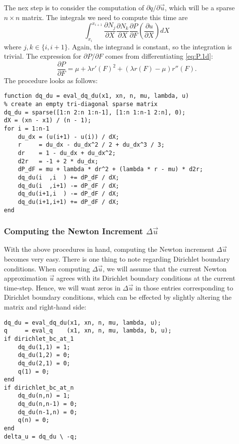 The nex step is to consider the computation of $\partial q/\partial\vec{u}$, which will be a sparse $n \times n$ matrix. The integrals we need to compute this time are
\begin{equation*}
\int_{x_i}^{x_{i+1}} \frac{\partial N_j}{\partial X} \frac{\partial N_k}{\partial X} \frac{\partial P}{\partial F} \left( \frac{\partial u}{\partial X} \right) dX
\end{equation*}
where $j,k \in \{i, i+1\}$. Again, the integrand is constant, so the integration is trivial. The expression for $\partial P/\partial F$ comes from differentiating \eqref{eq:P.1d}:
\begin{equation*}
\frac{\partial P}{\partial F} = \mu + \lambda r'(F)^2 + \left( \lambda r(F) - \mu \right) r''(F).
\end{equation*}
The procedure looks as follows:
\begin{verbatim}
function dq_du = eval_dq_du(x1, xn, n, mu, lambda, u)
% create an empty tri-diagonal sparse matrix
dq_du = sparse([1:n 2:n 1:n-1], [1:n 1:n-1 2:n], 0);
dX = (xn - x1) / (n - 1);
for i = 1:n-1
    du_dx = (u(i+1) - u(i)) / dX;
    r     = du_dx - du_dx^2 / 2 + du_dx^3 / 3;
    dr    = 1 - du_dx + du_dx^2;
    d2r   = -1 + 2 * du_dx;
    dP_dF = mu + lambda * dr^2 + (lambda * r - mu) * d2r;
    dq_du(i  ,i  ) += dP_dF / dX;
    dq_du(i  ,i+1) -= dP_dF / dX;
    dq_du(i+1,i  ) -= dP_dF / dX;
    dq_du(i+1,i+1) += dP_dF / dX;
end
\end{verbatim}

\subsubsection{Computing the Newton Increment $\Delta \vec{u}$}

With the above procedures in hand, computing the Newton increment $\Delta \vec{u}$ becomes very easy. There is one thing to note regarding Dirichlet boundary conditions. When computing $\Delta \vec{u}$, we will assume that the current Newton approximation $\vec{u}$ agrees with its Dirichlet boundary conditions at the current time-step. Hence, we will want zeros in $\Delta \vec{u}$ in those entries corresponding to Dirichlet boundary conditions, which can be effected by slightly altering the matrix and right-hand side:
\begin{verbatim}
dq_du = eval_dq_du(x1, xn, n, mu, lambda, u);
q     = eval_q    (x1, xn, n, mu, lambda, b, u);
if dirichlet_bc_at_1
    dq_du(1,1) = 1;
    dq_du(1,2) = 0;
    dq_du(2,1) = 0;
    q(1) = 0;
end
if dirichlet_bc_at_n
    dq_du(n,n) = 1;
    dq_du(n,n-1) = 0;
    dq_du(n-1,n) = 0;
    q(n) = 0;
end
delta_u = dq_du \ -q;
\end{verbatim}

